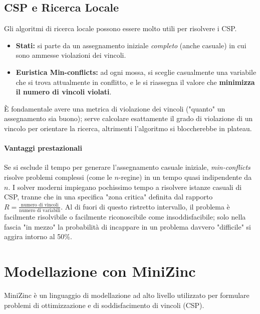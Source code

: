 \documentclass[a4paper,11pt]{report}
\begin{document}
\subsection{CSP e Ricerca Locale}
Gli algoritmi di ricerca locale possono essere molto utili per risolvere i CSP.
\begin{itemize}
    \item \textbf{Stati:} si parte da un assegnamento iniziale \textit{completo} (anche casuale) in cui sono ammesse violazioni dei vincoli.
    \item \textbf{Euristica Min-conflicts:} ad ogni mossa, si sceglie casualmente una variabile che si trova attualmente in conflitto, e le si riassegna il valore che \textbf{minimizza il numero di vincoli violati}.
\end{itemize}
È fondamentale avere una metrica di violazione dei vincoli ("quanto" un assegnamento sia buono); serve calcolare esattamente il grado di violazione di un vincolo per orientare la ricerca, altrimenti l'algoritmo si bloccherebbe in plateau.

\paragraph{Vantaggi prestazionali}
Se si esclude il tempo per generare l'assegnamento casuale iniziale, \textit{min-conflicts} risolve problemi complessi (come le $n$-regine) in un tempo quasi indipendente da $n$.
I solver moderni impiegano pochissimo tempo a risolvere istanze casuali di CSP, tranne che in una specifica "zona critica" definita dal rapporto $R = \frac{\text{numero di vincoli}}{\text{numero di variabili}}$. Al di fuori di questo ristretto intervallo, il problema è facilmente risolvibile o facilmente riconoscibile come insoddisfacibile; solo nella fascia "in mezzo" la probabilità di incappare in un problema davvero "difficile" si aggira intorno al 50\%.

\newpage
\section{Modellazione con MiniZinc}

    MiniZinc è un linguaggio di modellazione ad alto livello utilizzato per formulare problemi di ottimizzazione e di soddisfacimento di vincoli (CSP). 
\end{document}
